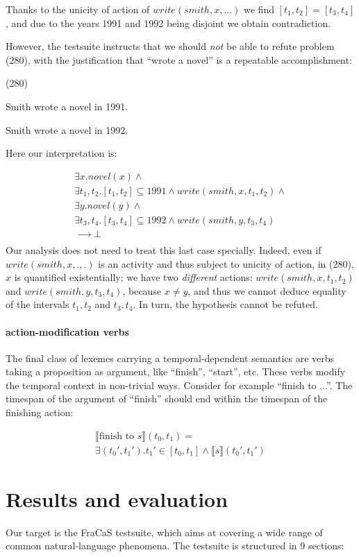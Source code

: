\documentclass[a4paper,11pt]{article}
\newcommand\hyp{\item[H]}
\newcommand\fracasex[2]{\begin{lingex}\item[(#1)] \begin{subex} #2 \end{subex} \end{lingex} }
\begin{document}
Thanks to the unicity of action of $write(smith,x,...)$ we find
\([t_1,t_2] = [t_3,t_4]\), and due to the years 1991 and 1992 being
disjoint we obtain contradiction.

However, the testsuite instructs that we should \emph{not} be able to refute
problem (280), with the justification that ``wrote a novel'' is a repeatable
accomplishment:

\fracasex{280}{
\item	Smith wrote a novel in 1991.
\hyp 	Smith wrote a novel in 1992.
}
Here our interpretation is:

\[\begin{array}{l}
∃x. novel(x) ∧ \\
∃t_1,t_2. [t_1,t_2] ⊆ 1991 ∧ write(smith,x,t_1,t_2) ∧ \\
∃y. novel(y) ∧ \\
∃t_3,t_4. [t_3,t_4] ⊆ 1992 ∧ write(smith,y,t_3,t_4) \\
⟶ ⊥ \\
\end{array}
\]
Our analysis does not need to treat this last case specially. Indeed,
even if $write(smith,x,.,.)$ is an activity  and thus subject to
unicity of action, in (280), $x$ is quantified existentially; we have
two \emph{different} actions: $write(smith,x,t_1,t_2)$ and
$write(smith,y,t_3,t_4)$, because $x \neq y$, and thus we cannot deduce equality of the
intervals $t_1,t_2$ and $t_3,t_4$. In turn, the hypothesis cannot be refuted.

\paragraph{action-modification verbs}

The final class of lexemes carrying a temporal-dependent semantics are
verbs taking a proposition as argument, like ``finish'', ``start'',
etc. These verbs modify the temporal context in non-trivial
ways. Consider for example ``finish to ...''. The timespan of the
argument of ``finish'' should end within the timespan of the finishing
action:

\begin{multline*}
⟦\text{finish to \(s\)}⟧(t_0,t_1) = \\ ∃(t_0',t_1'). t_1' ∈ [t_0,t_1] ∧ ⟦s⟧(t_0',t_1')
\end{multline*}


\section{Results and evaluation}
Our target is the FraCaS testsuite, which aims at covering a wide
range of common natural-language phenomena. The testsuite is structured in 9 sections:
\end{document}
